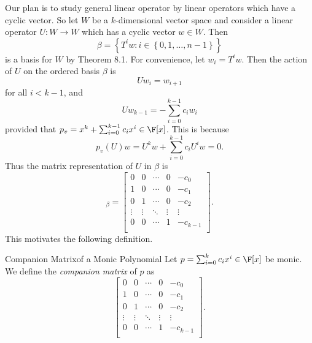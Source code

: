 \documentclass[linearalgebra]{subfiles}
\begin{document}
    \begin{remark}
        Our plan is to study general linear operator by linear operators which have a cyclic vector. So let $W$ be a $k$-dimensional vector space and consider a linear operator $U:W\to W$ which has a cyclic vector $w\in W$. Then
        \begin{equation*}
            \beta = \left\lbrace T^iw: i\in \left\lbrace 0,1,\ldots,n-1 \right\rbrace  \right\rbrace 
        \end{equation*}
        is a basis for $W$ by Theorem 8.1. For convenience, let $w_i = T^iw$. Then the action of $U$ on the ordered basis $\beta$ is
        \begin{equation*}
            Uw_i = w_{i+1}
        \end{equation*}
        for all $i<k-1$, and
        \begin{equation*}
            Uw_{k-1} = - \sum^{k-1}_{i=0} c_iw_i
        \end{equation*}
        provided that $p_v = x^k + \sum^{k-1}_{i=0} c_ix^i\in\F[x]$. This is because
        \begin{equation*}
            p_v(U)w = U^kw + \sum^{k-1}_{i=0} c_iU^iw = 0.
        \end{equation*}
        Thus the matrix representation of $U$ in $\beta$ is
        \begin{equation*}
            [U]_\beta = 
            \begin{bmatrix}
                0 & 0 & \cdots & 0 & -c_0 \\
                1 & 0 & \cdots & 0 & -c_1 \\
                0 & 1 & \cdots & 0 & -c_2 \\
                \vdots & \vdots & \ddots  & \vdots & \vdots \\
                0 & 0 & \cdots & 1 & -c_{k-1} \\
            \end{bmatrix}.
        \end{equation*}
        This motivates the following definition.
    \end{remark}

    \begin{definition}{Companion Matrix}{of a Monic Polynomial}
        Let $p = \sum^{k}_{i=0} c_ix^i\in\F[x]$ be monic. We define the \emph{companion matrix} of $p$ as
        \begin{equation*}
            \begin{bmatrix}
                0 & 0 & \cdots & 0 & -c_0 \\
                1 & 0 & \cdots & 0 & -c_1 \\
                0 & 1 & \cdots & 0 & -c_2 \\
                \vdots & \vdots & \ddots  & \vdots & \vdots \\
                0 & 0 & \cdots & 1 & -c_{k-1} \\
            \end{bmatrix}.
        \end{equation*}
    \end{definition}
\end{document}
